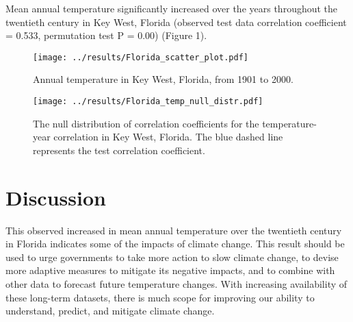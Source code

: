 \documentclass{article}
\begin{document}
    Mean annual temperature significantly increased over the years throughout the twentieth century in Key West, Florida (observed test data correlation coefficient = 0.533, permutation test P = 0.00) (Figure 1). \vspace{-0.5em}

    \begin{figure}[htbp]
    \centering
    \begin{minipage}{.5\textwidth}
        \centering
        \texttt{[image: ../results/Florida\_scatter\_plot.pdf]}
        \caption{Annual temperature in Key West, Florida, \newline from 1901 to 2000.}
        \label{fig.test1}
    \end{minipage}%
    \begin{minipage}{.5\textwidth}
        \centering
        \texttt{[image: ../results/Florida\_temp\_null\_distr.pdf]}
        \caption{The null distribution of correlation coefficients for the temperature-year correlation in Key West, Florida. The blue dashed line represents the test correlation coefficient.}
        \label{fig:test2}
    \end{minipage}
    \end{figure}\vspace{-1.5em}

\section{Discussion \vspace{-0.5em}}

    This observed increased in mean annual temperature over the twentieth century in Florida indicates some of the impacts of climate change. This result should be used to urge governments to take more action to slow climate change, to devise more adaptive measures to mitigate its negative impacts, and to combine with other data to forecast future temperature changes. With increasing availability of these long-term datasets, there is much scope for improving our ability to understand, predict, and mitigate climate change. \vspace{-1em}

\printbibliography
\end{document}
